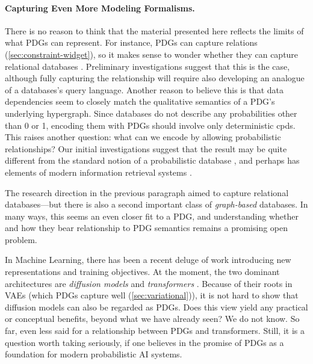 \paragraph{Capturing Even More Modeling Formalisms.}
There is no reason to think that the material presented here reflects the limits of what PDGs can represent. 
%
For instance, PDGs can capture relations (\cref{sec:constraint-widget}), so it makes sense to wonder whether they can capture relational databases
    \citep{abiteboul1995foundations}. 
Preliminary investigations suggest that this is the case,
    although fully capturing the relationship will require also developing an analogue of a databases's query language.  
Another reason to believe this is that data dependencies \citep{fagin1986theory} seem to closely match the qualitative semantics of a PDG's underlying hypergraph. 
Since databases do not describe any probabilities other than 0 or 1, 
    encoding them with PDGs should involve only deterministic cpds.
This raises another question: what can we encode by allowing probabilistic relationships?
Our initial investigations suggest that the result may be quite different from the standard notion of a probabilistic database \citep{suciu2011probabilistic}, and perhaps has elements of modern information retrieval systems \citep{info-retrieval}.

The research direction in the previous paragraph aimed to capture relational databases---but there is also a second important class of \emph{graph-based} databases.
In many ways, this seems an even closer fit to a PDG, and understanding whether and how they bear relationship to PDG semantics remains a promising open problem. 

In Machine Learning, there has been a recent deluge of work introducing new representations and training objectives. At the moment, the two dominant architectures are \emph{diffusion models} \citep{DDPMs} and \emph{transformers} \citep{transformers...}. 
Because of their roots in VAEs (which PDGs capture well (\cref{sec:variational})), it is not hard to show that diffusion models can also be regarded as PDGs. %
    Does this view yield any practical or conceptual benefits, beyond what we have already seen? 
    We do not know.
%
So far, even less said for a relationship between PDGs and transformers.
Still, it is a question worth taking seriously, if one believes in the promise of PDGs as a foundation for modern probabilistic AI systems.      

